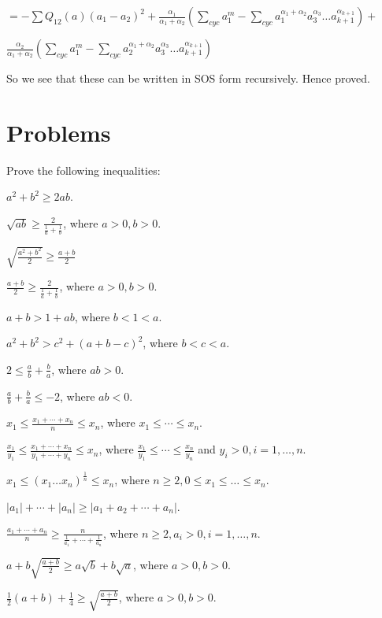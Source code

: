  $= -\sum Q_{12}(a)(a_1 - a_2)^2 + \frac{\alpha_1}{\alpha_1 + \alpha_2}\left(\sum_{cyc} a_1^m - \sum_{cyc}a_1^{\alpha_1 +
    \alpha_2}a_3^{\alpha_3}\ldots a_{k+1}^{\alpha_{k+1}}\right) + $

  $\frac{\alpha_2}{\alpha_1 + \alpha_2}\left(\sum_{cyc} a_1^m - \sum_{cyc}a_2^{\alpha_1 + \alpha_2}a_3^{\alpha_3}\ldots a_{k+1}^{\alpha_{k+1}}\right)$

  So we see that these can be written in SOS form recursively. Hence proved.
\stopproof

\section{Problems}
Prove the following inequalities:

\startitemize[n, 1*broad]
\item $a^2 + b^2 \geq 2ab$.
\item $\sqrt{ab}\geq \frac{2}{\frac{1}{a} + \frac{1}{b}}$, where $a>0, b>0$.
\item $\sqrt{\frac{a^2 + b^2}{2}}\geq \frac{a + b}{2}$
\item $\frac{a + b}{2}\geq \frac{2}{\frac{1}{a} + \frac{1}{b}}$, where $a>0, b>0$.
\item $a + b > 1 + ab$, where $b < 1 < a$.
\item $a^2 + b^2 > c^2 + (a + b - c)^2$, where $b < c< a$.
\item $2\leq \frac{a}{b} + \frac{b}{a}$, where $ab > 0$.
\item $\frac{a}{b} + \frac{b}{a}\leq -2$, where $ab < 0$.
\item $x_1\leq \frac{x_1 + \cdots + x_n}{n}\leq x_n$, where $x_1\leq \cdots\leq x_n$.
\item $\frac{x_1}{y_1}\leq \frac{x_1 + \cdots + x_n}{y_1 + \cdots + y_n}\leq x_n$, where $\frac{x_1}{y_1}\leq\cdots\leq
  \frac{x_n}{y_n}$ and $y_i> 0, i=1, \ldots, n$.
\item $x_1\leq(x_1\ldots x_n)^{\tfrac{1}{n}}\leq x_n$, where $n\geq 2, 0\leq x_1\leq\ldots\leq x_n$.
\item $|a_1| + \cdots + |a_n|\geq |a_1 + a_2 + \cdots + a_n|$.
\item $\frac{a_1 + \cdots + a_n}{n}\geq \frac{n}{\frac{1}{a_1} + \cdots + \frac{1}{a_n}}$, where $n\geq 2, a_i> 0, i=1, \ldots, n$.
\item $a + b\sqrt{\frac{a + b}{2}} \geq a\sqrt{b} + b\sqrt{a}$, where $a > 0, b > 0$.
\item $\frac{1}{2}(a + b) + \frac{1}{4}\geq \sqrt{\frac{a + b}{2}}$, where $a > 0, b > 0$.

